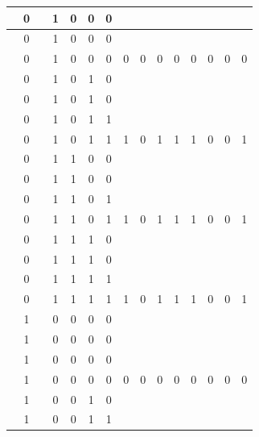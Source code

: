 \begin{table}[!tb]
\begin{tabular}{|c|c|c|c|c|c|c|c|c|c|c|c|c|c|c|}
        \rowcolor{yellow!40}  & 0 &  & 1 & 0 & 0 & 0 &  &  &  &  &  &  &  &  \\ \hline
        \rowcolor{yellow!40}  & 0 &  & 1 & 0 & 0 & 0 &  &  &  &  &  &  &  &  \\ \hline
        \rowcolor{yellow!40}  & 0 &  & 1 & 0 & 0 & 0 & 0 & 0 & 0 & 0 & 0 & 0 & 0 & 0 \\ \hline
        \rowcolor{gray!40}  & 0 &  & 1 & 0 & 1 & 0 &  &  &  &  &  &  &  &  \\ \hline
        \rowcolor{gray!40}  & 0 &  & 1 & 0 & 1 & 0 &  &  &  &  &  &  &  &  \\ \hline
        \rowcolor{gray!40}  & 0 &  & 1 & 0 & 1 & 1 &  &  &  &  &  &  &  &  \\ \hline
        \rowcolor{gray!40}  & 0 &  & 1 & 0 & 1 & 1 & 1 & 0 & 1 & 1 & 1 & 0 & 0 & 1 \\ \hline
        \rowcolor{blue!40}  & 0 &  & 1 & 1 & 0 & 0 &  &  &  &  &  &  &  &  \\ \hline
        \rowcolor{blue!40}  & 0 &  & 1 & 1 & 0 & 0 &  &  &  &  &  &  &  &  \\ \hline
        \rowcolor{blue!40}  & 0 &  & 1 & 1 & 0 & 1 &  &  &  &  &  &  &  &  \\ \hline
        \rowcolor{blue!40}  & 0 &  & 1 & 1 & 0 & 1 & 1 & 0 & 1 & 1 & 1 & 0 & 0 & 1 \\ \hline
        \rowcolor{red!40}  & 0 &  & 1 & 1 & 1 & 0 &  &  &  &  &  &  &  &  \\ \hline
        \rowcolor{red!40}  & 0 &  & 1 & 1 & 1 & 0 &  &  &  &  &  &  &  &  \\ \hline
        \rowcolor{red!40}  & 0 &  & 1 & 1 & 1 & 1 &  &  &  &  &  &  &  &  \\ \hline
        \rowcolor{red!40}  & 0 &  & 1 & 1 & 1 & 1 & 1 & 0 & 1 & 1 & 1 & 0 & 0 & 1 \\ \hline
        \rowcolor{green!40}  & 1 &  & 0 & 0 & 0 & 0 &  &  &  &  &  &  &  &  \\ \hline
        \rowcolor{green!40}  & 1 &  & 0 & 0 & 0 & 0 &  &  &  &  &  &  &  &  \\ \hline
        \rowcolor{green!40}  & 1 &  & 0 & 0 & 0 & 0 &  &  &  &  &  &  &  &  \\ \hline
        \rowcolor{green!40}  & 1 &  & 0 & 0 & 0 & 0 & 0 & 0 & 0 & 0 & 0 & 0 & 0 & 0 \\ \hline
        \rowcolor{yellow!40}  & 1 &  & 0 & 0 & 1 & 0 &  &  &  &  &  &  &  &  \\ \hline
        \rowcolor{yellow!40}  & 1 &  & 0 & 0 & 1 & 1 &  &  &  &  &  &  &  &  \\ \hline

\end{tabular}
\end{table}
